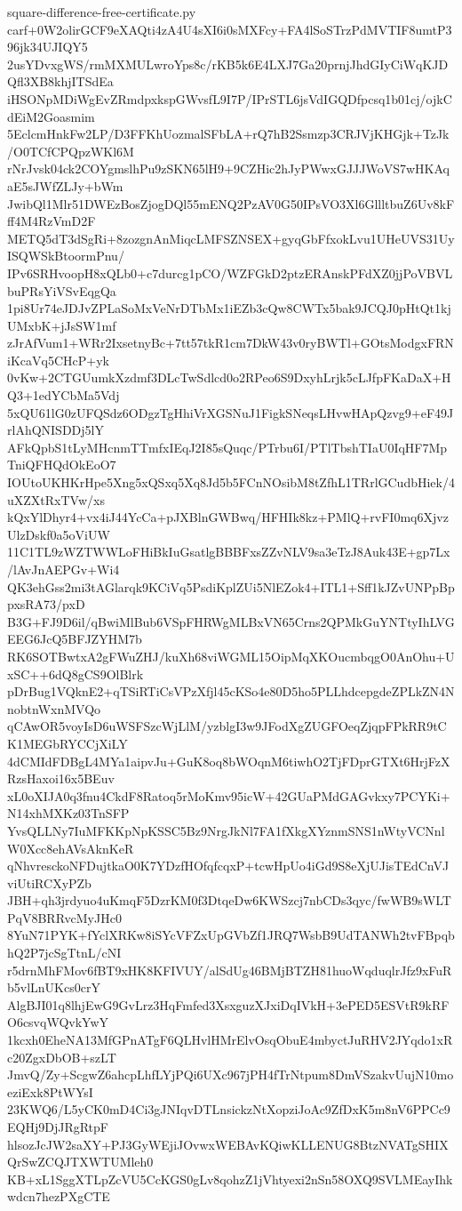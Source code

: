\documentclass[11pt]{article}
\theoremstyle{definition}
\theoremstyle{remark}
\begin{document}
\begin{filecontents*}[overwrite]{square-difference-free-certificate.py}
carf+0W2olirGCF9eXAQti4zA4U4sXI6i0sMXFcy+FA4lSoSTrzPdMVTIF8umtP396jk34UJIQY5
2usYDvxgWS/rmMXMULwroYps8c/rKB5k6E4LXJ7Ga20prnjJhdGIyCiWqKJDQfl3XB8khjITSdEa
iHSONpMDiWgEvZRmdpxkspGWvsfL9I7P/IPrSTL6jsVdIGQDfpcsq1b01cj/ojkCdEiM2Goasmim
5EclcmHnkFw2LP/D3FFKhUozmalSFbLA+rQ7hB2Ssmzp3CRJVjKHGjk+TzJk/O0TCfCPQpzWKl6M
rNrJvsk04ck2COYgmslhPu9zSKN65lH9+9CZHic2hJyPWwxGJJJWoVS7wHKAqaE5sJWfZLJy+bWm
JwibQl1Mlr51DWEzBosZjogDQl55mENQ2PzAV0G50IPsVO3Xl6GllltbuZ6Uv8kFff4M4RzVmD2F
METQ5dT3dSgRi+8zozgnAnMiqcLMFSZNSEX+gyqGbFfxokLvu1UHeUVS31UyISQWSkBtoormPnu/
IPv6SRHvoopH8xQLb0+c7durcg1pCO/WZFGkD2ptzERAnskPFdXZ0jjPoVBVLbuPRsYiVSvEqgQa
1pi8Ur74eJDJvZPLaSoMxVeNrDTbMx1iEZb3cQw8CWTx5bak9JCQJ0pHtQt1kjUMxbK+jJsSW1mf
zJrAfVum1+WRr2IxsetnyBc+7tt57tkR1cm7DkW43v0ryBWTl+GOtsModgxFRNiKcaVq5CHcP+yk
0vKw+2CTGUumkXzdmf3DLcTwSdlcd0o2RPeo6S9DxyhLrjk5cLJfpFKaDaX+HQ3+1edYCbMa5Vdj
5xQU61lG0zUFQSdz6ODgzTgHhiVrXGSNuJ1FigkSNeqsLHvwHApQzvg9+eF49JrlAhQNISDDj5lY
AFkQpbS1tLyMHcnmTTmfxIEqJ2I85sQuqc/PTrbu6I/PTlTbshTIaU0IqHF7MpTniQFHQdOkEoO7
IOUtoUKHKrHpe5Xng5xQSxq5Xq8Jd5b5FCnNOsibM8tZfhL1TRrlGCudbHiek/4uXZXtRxTVw/xs
kQxYlDhyr4+vx4iJ44YcCa+pJXBlnGWBwq/HFHIk8kz+PMlQ+rvFI0mq6XjvzUlzDskf0a5oViUW
11C1TL9zWZTWWLoFHiBkIuGsatlgBBBFxsZZvNLV9sa3eTzJ8Auk43E+gp7Lx/lAvJnAEPGv+Wi4
QK3ehGss2mi3tAGlarqk9KCiVq5PsdiKplZUi5NlEZok4+ITL1+Sff1kJZvUNPpBppxsRA73/pxD
B3G+FJ9D6il/qBwiMlBub6VSpFHRWgMLBxVN65Crns2QPMkGuYNTtyIhLVGEEG6JcQ5BFJZYHM7b
RK6SOTBwtxA2gFWuZHJ/kuXh68viWGML15OipMqXKOucmbqgO0AnOhu+UxSC++6dQ8gCS9OlBlrk
pDrBug1VQknE2+qTSiRTiCsVPzXfjl45cKSo4e80D5ho5PLLhdcepgdeZPLkZN4NnobtnWxnMVQo
qCAwOR5voyIsD6uWSFSzcWjLlM/yzblgI3w9JFodXgZUGFOeqZjqpFPkRR9tCK1MEGbRYCCjXiLY
4dCMIdFDBgL4MYa1aipvJu+GuK8oq8bWOqnM6tiwhO2TjFDprGTXt6HrjFzXRzsHaxoi16x5BEuv
xL0oXIJA0q3fnu4CkdF8Ratoq5rMoKmv95icW+42GUaPMdGAGvkxy7PCYKi+N14xhMXKz03TnSFP
YvsQLLNy7IuMFKKpNpKSSC5Bz9NrgJkNl7FA1fXkgXYznmSNS1nWtyVCNnlW0Xcc8ehAVsAknKeR
qNhvresckoNFDujtkaO0K7YDzfHOfqfcqxP+tcwHpUo4iGd9S8eXjUJisTEdCnVJviUtiRCXyPZb
JBH+qh3jrdyuo4uKmqF5DzrKM0f3DtqeDw6KWSzcj7nbCDs3qyc/fwWB9sWLTPqV8BRRvcMyJHc0
8YuN71PYK+fYclXRKw8iSYcVFZxUpGVbZf1JRQ7WsbB9UdTANWh2tvFBpqbhQ2P7jcSgTtnL/cNI
r5drnMhFMov6fBT9xHK8KFIVUY/alSdUg46BMjBTZH81huoWqduqlrJfz9xFuRb5vlLnUKcs0crY
AlgBJI01q8lhjEwG9GvLrz3HqFmfed3XsxguzXJxiDqIVkH+3ePED5ESVtR9kRFO6csvqWQvkYwY
1kcxh0EheNA13MfGPnATgF6QLHvlHMrElvOsqObuE4mbyctJuRHV2JYqdo1xRc20ZgxDbOB+szLT
JmvQ/Zy+ScgwZ6ahcpLhfLYjPQi6UXc967jPH4fTrNtpum8DmVSzakvUujN10moeziExk8PtWYsI
23KWQ6/L5yCK0mD4Ci3gJNIqvDTLnsickzNtXopziJoAc9ZfDxK5m8nV6PPCc9EQHj9DjJRgRtpF
hlsozJcJW2saXY+PJ3GyWEjiJOvwxWEBAvKQiwKLLENUG8BtzNVATgSHIXQrSwZCQJTXWTUMleh0
KB+xL1SggXTLpZcVU5CcKGS0gLv8qohzZ1jVhtyexi2nSn58OXQ9SVLMEayIhkwdcn7hezPXgCTE

\end{filecontents*}
\end{document}
